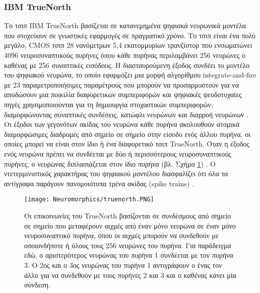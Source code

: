 \documentclass[12pt]{report}
\begin{document}
\subsubsection{\textlatin{IBM TrueNorth}}
Το τσιπ \textlatin{IBM TrueNorth}  βασίζεται σε κατανεμημένα ψηφιακά νευρωνικά μοντέλα που στοχεύουν σε γνωστικές εφαρμογές σε πραγματικό χρόνο. Το τσιπ είναι ένα πολύ μεγάλο, \textlatin{CMOS} τσιπ 28 νανόμετρων 5,4 εκατομμυρίων τρανζίστορ που ενσωματώνει 4096 νευροσυναπτικούς πυρήνες όπου κάθε πυρήνας περιλαμβάνει 256 νευρώνες ο καθένας με 256 συναπτικές εισόδους. Η διασταυρούμενη έξοδος συνδέει το μοντέλο του ψηφιακού νευρώνα, το οποίο εφαρμόζει μια μορφή αλγορίθμου \textlatin{integrate-and-fire} με 23 παραμετροποιήσιμες παραμέτρους που μπορούν να προσαρμοστούν για να αποδώσουν μια ποικιλία διαφορετικών συμπεριφορών και ψηφιακές ψευδοτυχαίες πηγές χρησιμοποιούνται για τη δημιουργία στοχαστικών συμπεριφορών, διαμορφώνοντας συναπτικές συνδέσεις, κατώφλι νευρώνων και διαρροή νευρώνων \cite{cassidy2013}. Οι έξοδοι των γεγονότων ακίδας του νευρώνα κάθε πυρήνα ακολουθούν ατομικά διαμορφώσιμες διαδρομές από σημείο σε σημείο στην είσοδο ενός άλλου πυρήνα, οι οποίες μπορεί να είναι στον ίδιο ή ένα διαφορετικό τσιπ \textlatin{TrueNorth}. Όταν η έξοδος ενός νευρώνα πρέπει να συνδέεται με δύο ή περισσότερους νευροσυναπτικούς πυρήνες, ο νευρώνας διπλασιάζεται στον ίδιο πυρήνα (βλ. Σχήμα \ref{fig:truenorth}) . Ο ντετερμινιστικός χαρακτήρας του ψηφιακού μοντέλου διασφαλίζει ότι όλα τα αντίγραφα παράγουν πανομοιότυπα τρένα ακίδας (\textlatin{spike trains}) \cite{furber2016}.
\begin{figure}[htp]
    \centering
    \texttt{[image: Neuromorphics/truenorth.PNG]}
    \caption{Οι επικοινωνίες του \textlatin{TrueNorth}  βασίζονται σε συνδέσμους από σημείο σε σημείο που μεταφέρουν αιχμές από έναν μόνο νευρώνα σε έναν μόνο νευροσυναπτικό πυρήνα, όπου οι αιχμές μπορούν να συνδεθούν με οποιονδήποτε ή όλους τους 256 νευρώνες του πυρήνα. Για παράδειγμα εδώ, ο αριστερότερος νευρώνας του πυρήνα 1 συνδέεται με τον πυρήνα 3. Ο 2ος και ο 3ος νευρώνας του πυρήνα 1 αντιγράφουν ο ένας τον άλλο για να συνδεθούν με τους πυρήνες 2 και 3 και ο καθένας κάνει μία σύνδεση. }
    \label{fig:truenorth}
\end{figure}
\end{document}
